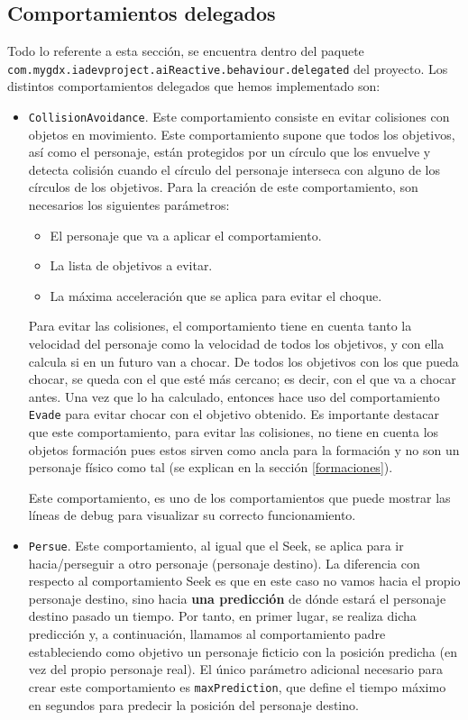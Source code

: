 \medskip
\subsection{Comportamientos delegados}
Todo lo referente a esta sección, se encuentra dentro del paquete \\ \texttt{com.mygdx.iadevproject.aiReactive.behaviour.delegated} del proyecto. Los distintos comportamientos delegados que hemos implementado son:
\begin{itemize}
 \item \texttt{CollisionAvoidance}. Este comportamiento consiste en evitar colisiones con objetos en movimiento. Este comportamiento supone que todos los objetivos, así como el personaje, están protegidos por un círculo que los envuelve y detecta colisión cuando el círculo del personaje interseca con alguno de los círculos de los objetivos. Para la creación de este comportamiento, son necesarios los siguientes parámetros:
 \begin{itemize}
  \item El personaje que va a aplicar el comportamiento.
  \item La lista de objetivos a evitar.
  \item La máxima acceleración que se aplica para evitar el choque.
 \end{itemize}
 Para evitar las colisiones, el comportamiento tiene en cuenta tanto la velocidad del personaje como la velocidad de todos los objetivos, y con ella calcula si en un futuro van a chocar. De todos los objetivos con los que pueda chocar, se queda con el que esté más cercano; es decir, con el que va a chocar antes. Una vez que lo ha calculado, entonces hace uso del comportamiento \texttt{Evade} para evitar chocar con el objetivo obtenido. Es importante destacar que este comportamiento, para evitar las colisiones, no tiene en cuenta los objetos formación pues estos sirven como ancla para la formación y no son un personaje físico como tal (se explican en la sección \ref{formaciones}).
 
 Este comportamiento, es uno de los comportamientos que puede mostrar las líneas de debug para visualizar su correcto funcionamiento. 
 
 \item \texttt{Persue}. Este comportamiento, al igual que el Seek, se aplica para ir hacia/perseguir a otro personaje (personaje destino). La diferencia con respecto al comportamiento Seek es que en este caso no vamos hacia el propio personaje destino, sino hacia \textbf{una predicción} de dónde estará el personaje destino pasado un tiempo. Por tanto, en primer lugar, se realiza dicha predicción y, a continuación, llamamos al comportamiento padre estableciendo como objetivo un personaje ficticio con la posición predicha (en vez del propio personaje real). El único parámetro adicional necesario para crear este comportamiento es \texttt{maxPrediction}, que define el tiempo máximo en segundos para predecir la posición del personaje destino.
  

\end{itemize}
